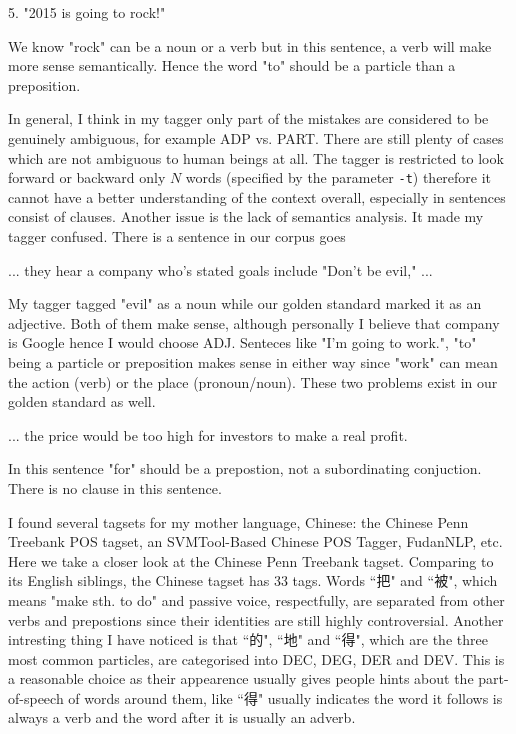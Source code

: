 \documentclass[11pt]{article} %
\begin{document}
\begin{displayquote}
  5. "2015 is going to rock!"
\end{displayquote}
We know "rock" can be a noun or a verb but in this sentence, a verb will make more sense semantically. Hence the word "to" should be a particle than a preposition.

In general, I think in my tagger only part of the mistakes are considered to be genuinely ambiguous, for example ADP vs. PART. There are still plenty of cases which are not ambiguous to human beings at all. The tagger is restricted to look forward or backward only $N$ words (specified by the parameter \texttt{-t}) therefore it cannot have a better understanding of the context overall, especially in sentences consist of clauses. Another issue is the lack of semantics analysis. It made my tagger confused. There is a sentence in our corpus goes
\begin{displayquote}
  ... they hear a company who's stated goals include "Don't be evil," ...
\end{displayquote}

My tagger tagged "evil" as a noun while our golden standard marked it as an adjective. Both of them make sense, although personally I believe that company is Google hence I would choose ADJ. Senteces like "I'm going to work.", "to" being a particle or preposition makes sense in either way since "work" can mean the action (verb) or the place (pronoun/noun). These two problems exist in our golden standard as well.
\begin{displayquote}
  ... the price would be too high for investors to make a real profit.
\end{displayquote}
In this sentence "for" should be a prepostion, not a subordinating conjuction. There is no clause in this sentence.

I found several tagsets for my mother language, Chinese: the Chinese Penn Treebank POS tagset\cite{xia2000part}, an SVMTool-Based Chinese POS Tagger\cite{svmtool}, FudanNLP\cite{qiu2013fudannlp}, etc. Here we take a closer look at the Chinese Penn Treebank tagset. Comparing to its English siblings, the Chinese tagset has 33 tags. Words ``把" and ``被", which means "make sth. to do" and passive voice, respectfully, are separated from other verbs and prepostions since their identities are still highly controversial. Another intresting thing I have noticed is that ``的", ``地" and ``得", which are the three most common particles, are categorised into DEC, DEG, DER and DEV. This is a reasonable choice as their appearence usually gives people hints about the part-of-speech of words around them, like ``得" usually indicates the word it follows is always a verb and the word after it is usually an adverb.
\end{document}
